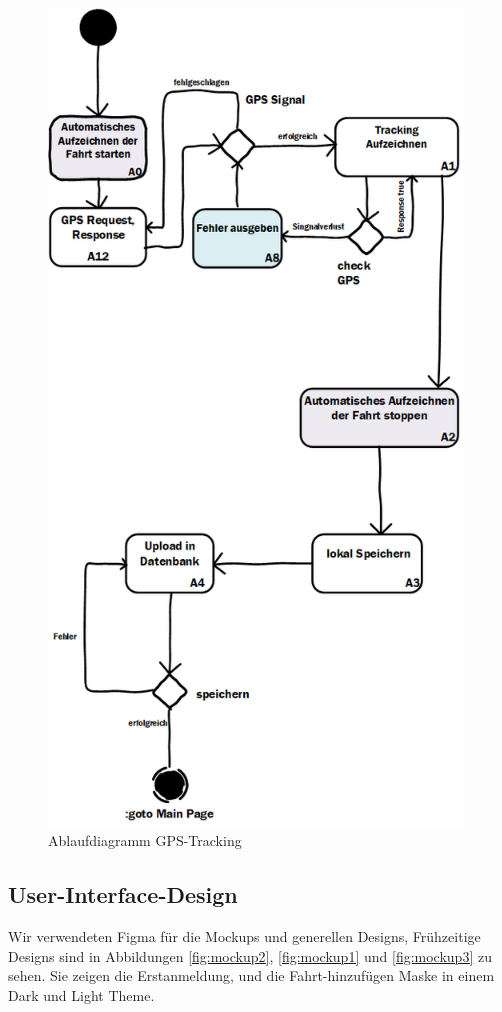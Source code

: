 \begin{figure}[H]
	\centering
	\includegraphics[width=11cm]{figures/Ablaufdiagramm_Tracking_LD_APP.png}
	\caption{Ablaufdiagramm GPS-Tracking}
	\label{fig:Ablaufdiagramm2}
\end{figure}

\newpage
\subsection{User-Interface-Design}
Wir verwendeten Figma für die Mockups und generellen Designs, Frühzeitige Designs sind in Abbildungen \ref{fig:mockup2}, \ref{fig:mockup1} und \ref{fig:mockup3} zu sehen. Sie zeigen die Erstanmeldung, und die Fahrt-hinzufügen Maske in einem Dark und Light Theme.

